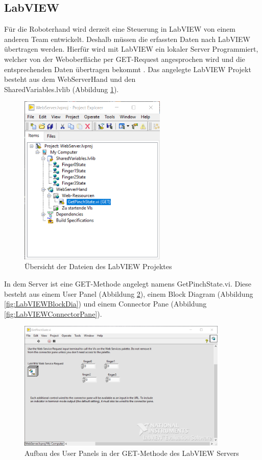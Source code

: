 \documentclass[a4paper,12pt,final]{article} %
\numberwithin{equation}{section} %
\numberwithin{figure}{section} %
\numberwithin{table}{section} %
\begin{document}
\subsection{LabVIEW}
Für die Roboterhand wird derzeit eine Steuerung in LabVIEW von einem anderen Team entwickelt. 
Deshalb müssen die erfassten Daten nach LabVIEW übertragen werden. Hierfür wird mit LabVIEW ein lokaler Server Programmiert, welcher von der Weboberfläche per GET-Request angesprochen wird und die entsprechenden Daten übertragen bekommt \cite{NIwebserverTutorial}.
Das angelegte LabVIEW Projekt besteht aus dem WebServerHand und den \\SharedVariables.lvlib (Abbildung \ref{fig:ProjektExplorer}).
\begin{figure}[H]
	\begin{center}
		\includegraphics[width=7cm]{Bilder/ProjektExplorer.png}
		\caption{Übersicht der Dateien des LabVIEW Projektes}
		\label{fig:ProjektExplorer}
	\end{center}
\end{figure}
In dem Server ist eine GET-Methode angelegt namens GetPinchState.vi. Diese besteht aus einem User Panel (Abbildung \ref{fig:LabVIEWuserPanel}), einem Block Diagram (Abbildung \ref{fig:LabVIEWBlockDia}) und einem Connector Pane (Abbildung \ref{fig:LabVIEWConnectorPane}).
\begin{figure}[H]
	\begin{center}
		\includegraphics[width=10cm]{Bilder/UserPanel.png}
		\caption{Aufbau des User Panels in der GET-Methode des LabVIEW Servers}
		\label{fig:LabVIEWuserPanel}
	\end{center}
\end{figure}  
\end{document}
